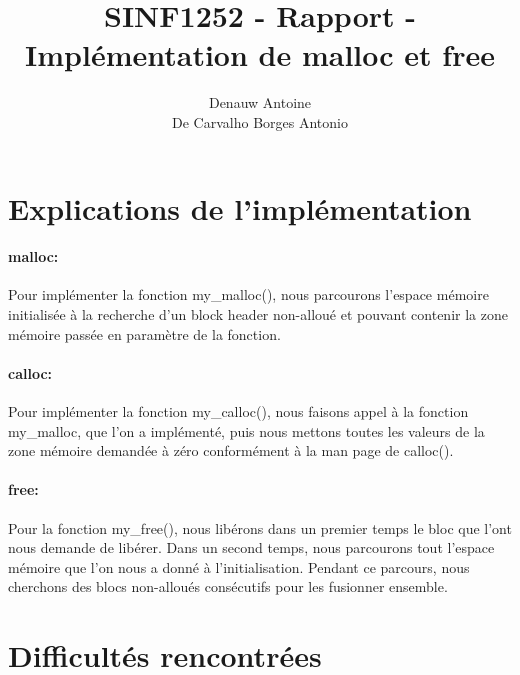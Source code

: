 \documentclass[10pt,a4paper]{article}
\begin{document}
\author{Denauw Antoine\\ De Carvalho Borges Antonio}
\title{SINF1252 - Rapport - Implémentation de malloc et free}
\maketitle

\tableofcontents


\newpage

\section{Explications de l'implémentation}

\paragraph{malloc:} Pour implémenter la fonction my\_malloc(), nous parcourons l'espace mémoire initialisée à la recherche d'un block header non-alloué et pouvant contenir la zone mémoire passée en paramètre de la fonction.

\paragraph{calloc:} Pour implémenter la fonction my\_calloc(), nous faisons appel à la fonction my\_malloc, que l'on a implémenté, puis nous mettons toutes les valeurs de la zone mémoire demandée à zéro conformément à la man page de calloc().

\paragraph{free:} Pour la fonction my\_free(), nous libérons dans un premier temps le bloc que l'ont nous demande de libérer. Dans un second temps, nous parcourons tout l'espace mémoire que l'on nous a donné à l'initialisation. Pendant ce parcours, nous cherchons des blocs non-alloués consécutifs pour les fusionner ensemble.


\section{Difficultés rencontrées}
\end{document}
